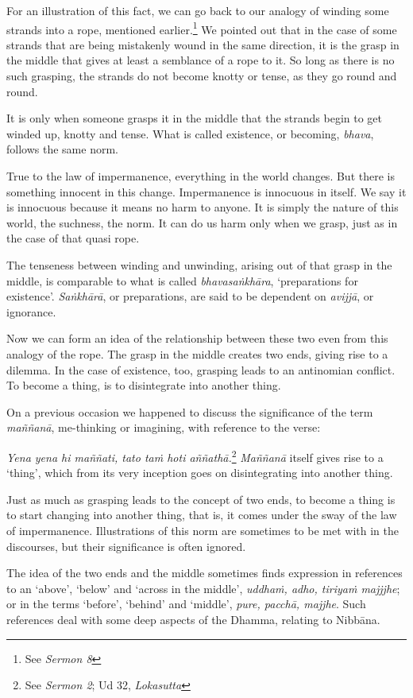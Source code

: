 For an illustration of this fact, we can go back to our analogy of winding some strands into a rope, mentioned earlier.\footnote{See \emph{Sermon 8}} We pointed out that in the case of some strands that are being mistakenly wound in the same direction, it is the grasp in the middle that gives at least a semblance of a rope to it. So long as there is no such grasping, the strands do not become knotty or tense, as they go round and round.

It is only when someone grasps it in the middle that the strands begin to get winded up, knotty and tense. What is called existence, or becoming, \emph{bhava}, follows the same norm.

True to the law of impermanence, everything in the world changes. But there is something innocent in this change. Impermanence is innocuous in itself. We say it is innocuous because it means no harm to anyone. It is simply the nature of this world, the suchness, the norm. It can do us harm only when we grasp, just as in the case of that quasi rope.

The tenseness between winding and unwinding, arising out of that grasp in the middle, is comparable to what is called \emph{bhavasaṅkhāra}, `preparations for existence'. \emph{Saṅkhārā}, or preparations, are said to be dependent on \emph{avijjā}, or ignorance.

Now we can form an idea of the relationship between these two even from this analogy of the rope. The grasp in the middle creates two ends, giving rise to a dilemma. In the case of existence, too, grasping leads to an antinomian conflict. To become a thing, is to disintegrate into another thing.

On a previous occasion we happened to discuss the significance of the term \emph{maññanā}, me-thinking or imagining, with reference to the verse:

\emph{Yena yena hi maññati, tato taṁ hoti aññathā.}\footnote{See \emph{Sermon 2}; Ud 32, \emph{Lokasutta}} \emph{Maññanā} itself gives rise to a `thing', which from its very inception goes on disintegrating into another thing.

Just as much as grasping leads to the concept of two ends, to become a thing is to start changing into another thing, that is, it comes under the sway of the law of impermanence. Illustrations of this norm are sometimes to be met with in the discourses, but their significance is often ignored.

The idea of the two ends and the middle sometimes finds expression in references to an `above', `below' and `across in the middle', \emph{uddhaṁ, adho, tiriyaṁ majjjhe}; or in the terms `before', `behind' and `middle', \emph{pure, pacchā, majjhe}. Such references deal with some deep aspects of the Dhamma, relating to Nibbāna.


